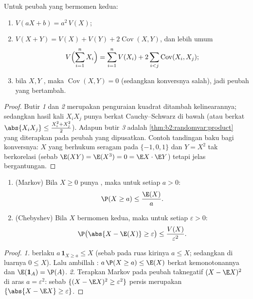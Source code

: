 \begin{theorem}\label{thm:b2:randomvar:variancerules}
Untuk peubah yang bermomen kedua:
\begin{enumerate}
\item $V(aX + b) = a^2\,V(X)$;
\item $V(X + Y) = V(X) + V(Y) + 2\operatorname{Cov}(X, Y)$, dan
lebih umum
\[
V\Bigl(\sum_{i=1}^n X_i\Bigr)
= \sum_{i=1}^n V(X_i)
+ 2\sum_{i < j}\operatorname{Cov}(X_i, X_j) ;
\]
\item bila $X, Y$ , maka $\operatorname{Cov}(X, Y) = 0$
(sedangkan konversnya salah), jadi  peubah yang 
bertambah.
\end{enumerate}
\end{theorem}

\begin{proof}
Butir \emph{1} dan \emph{2} merupakan penguraian kuadrat ditambah kelinearannya;
sedangkan hasil kali $X_iX_j$ punya  berkat Cauchy--Schwarz di bawah
(atau berkat $\abs{X_iX_j} \leq \frac{X_i^2 + X_j^2}{2}$). Adapun butir \emph{3} adalah
\cref{thm:b2:randomvar:product} yang diterapkan pada peubah yang
dipusatkan. Contoh tandingan baku bagi konversnya: $X$ yang berhukum seragam
pada $\{-1, 0, 1\}$ dan $Y = X^2$ tak berkorelasi
(sebab $\E(XY) = \E(X^3) = 0 = \E X \cdot \E Y$) tetapi jelas bergantungan.
\end{proof}

\begin{theorem}\label{thm:b2:randomvar:markov}
\leavevmode
\begin{enumerate}
\item (Markov) Bila $X \geq 0$ punya , maka untuk setiap $a
> 0$:
\[
\P(X \geq a) \leq \frac{\E(X)}{a} .
\]
\item (Chebyshev) Bila $X$ bermomen kedua, maka untuk setiap
$\varepsilon > 0$:
\[
\P\bigl(\abs{X - \E(X)} \geq \varepsilon\bigr)
\leq \frac{V(X)}{\varepsilon^2} .
\]
\end{enumerate}
\end{theorem}

\begin{proof}
\emph{1.}  berlaku $a\,\mathbf{1}_{X \geq a} \leq X$ (sebab pada
 ruas kirinya $a \leq X$; sedangkan di luarnya $0 \leq X$). Lalu ambillah
: $a\,\P(X \geq a) \leq \E(X)$ berkat kemonotonannya dan
$\E(\mathbf{1}_A) = \P(A)$.
\emph{2.} Terapkan Markov pada peubah taknegatif $(X - \E
X)^2$ di aras $a = \varepsilon^2$: sebab  $\{(X - \E X)^2
\geq \varepsilon^2\}$ persis merupakan $\{\abs{X - \E X} \geq
\varepsilon\}$.
\end{proof}

